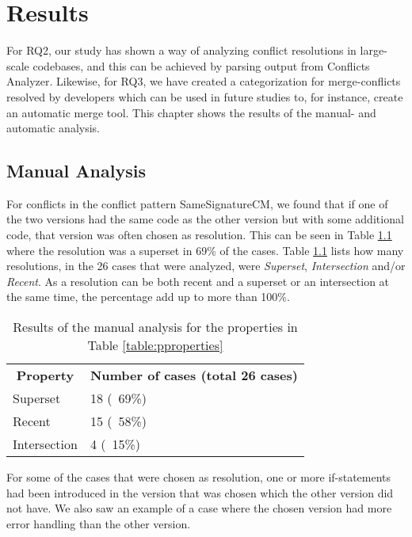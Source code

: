 \chapter{Results}
For RQ2, our study has shown a way of analyzing conflict resolutions in large-scale codebases, and this can be achieved by parsing output from Conflicts Analyzer. Likewise, for RQ3, we have created a categorization for merge-conflicts resolved by developers which can be used in future studies to, for instance, create an automatic merge tool. This chapter shows the results of the manual- and automatic analysis.
\section{Manual Analysis}
For conflicts in the conflict pattern SameSignatureCM, we found that if one of the two versions had the same code as the other version but with some additional code, that version was often chosen as resolution. This can be seen in Table \ref{table:rcsitma} where the resolution was a superset in 69\% of the cases. Table \ref{table:rcsitma} lists how many resolutions, in the 26 cases that were analyzed, were \textit{Superset}, \textit{Intersection} and/or \textit{Recent}. As a resolution can be both recent and a superset or an intersection at the same time, the percentage add up to more than 100\%.
\begin{table}
\caption{Results of the manual analysis for the properties in Table \ref{table:pproperties}}\label{table:rcsitma}
\begin{tabular}{ p{6cm} p{6cm} }
\hline
\multicolumn{1}{c}{\textbf{Property}} & \multicolumn{1}{c}{\textbf{Number of cases (total 26 cases)}}\\
Superset & 18 (~69\%)\\
Recent & 15 (~58\%)\\
Intersection & 4 (~15\%)\\
\end{tabular}
\end{table}
\FloatBarrier
For some of the cases that were chosen as resolution, one or more if-statements had been introduced in the version that was chosen which the other version did not have. We also saw an example of a case where the chosen version had more error handling than the other version.

